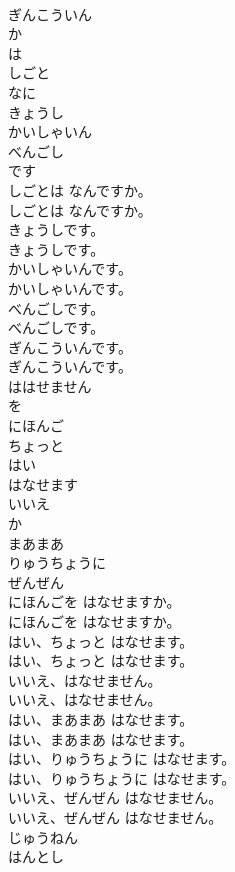 \documentclass[8pt]{extreport}
\begin{document}
\begin{CJK}{UTF8}{min}
\\	ぎんこういん
\\	か
\\	は
\\	しごと
\\	なに
\\	きょうし
\\	かいしゃいん
\\	べんごし
\\	です
\\	しごとは なんですか。	
\\	しごとは なんですか。 
\\	きょうしです。	
\\	きょうしです。 
\\	かいしゃいんです。	
\\	かいしゃいんです。 
\\	べんごしです。	
\\	べんごしです。 
\\	ぎんこういんです。	
\\	ぎんこういんです。 
\\	ははせません
\\	を
\\	にほんご
\\	ちょっと
\\	はい
\\	はなせます
\\	いいえ
\\	か
\\	まあまあ
\\	りゅうちょうに
\\	ぜんぜん
\\	にほんごを はなせますか。	
\\	にほんごを はなせますか。 
\\	はい、ちょっと はなせます。	
\\	はい、ちょっと はなせます。 
\\	いいえ、はなせません。	
\\	いいえ、はなせません。 
\\	はい、まあまあ はなせます。	
\\	はい、まあまあ はなせます。 
\\	はい、りゅうちょうに はなせます。	
\\	はい、りゅうちょうに はなせます。 
\\	いいえ、ぜんぜん はなせません。	
\\	いいえ、ぜんぜん はなせません。 
\\	じゅうねん
\\	はんとし

\end{CJK}
\end{document}
